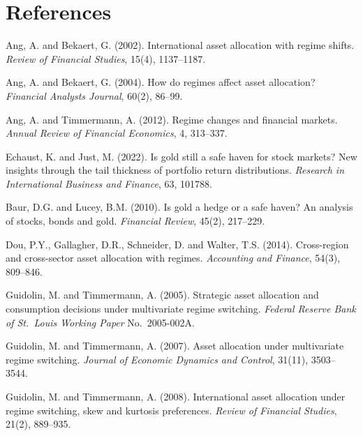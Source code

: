 \documentclass[12pt, a4paper]{article}
\begin{document}
\section*{References}

\begin{description}[leftmargin=2em, itemsep=2pt]

\item Ang, A. and Bekaert, G. (2002). International asset allocation with regime shifts.
  \textit{Review of Financial Studies}, 15(4), 1137--1187.

\item Ang, A. and Bekaert, G. (2004). How do regimes affect asset allocation?
  \textit{Financial Analysts Journal}, 60(2), 86--99.

\item Ang, A. and Timmermann, A. (2012). Regime changes and financial markets.
  \textit{Annual Review of Financial Economics}, 4, 313--337.

\item Echaust, K. and Just, M. (2022). Is gold still a safe haven for stock markets? New insights through the tail thickness of portfolio return distributions. \textit{Research in International Business and Finance}, 63, 101788.

\item Baur, D.G. and Lucey, B.M. (2010). Is gold a hedge or a safe haven? An analysis of
  stocks, bonds and gold. \textit{Financial Review}, 45(2), 217--229.

\item Dou, P.Y., Gallagher, D.R., Schneider, D. and Walter, T.S. (2014). Cross-region and
  cross-sector asset allocation with regimes. \textit{Accounting and Finance}, 54(3),
  809--846.

\item Guidolin, M. and Timmermann, A. (2005). Strategic asset allocation and consumption
  decisions under multivariate regime switching. \textit{Federal Reserve Bank of St.\ Louis
  Working Paper} No.\ 2005-002A.

\item Guidolin, M. and Timmermann, A. (2007). Asset allocation under multivariate regime
  switching. \textit{Journal of Economic Dynamics and Control}, 31(11), 3503--3544.

\item Guidolin, M. and Timmermann, A. (2008). International asset allocation under regime
  switching, skew and kurtosis preferences. \textit{Review of Financial Studies}, 21(2),
  889--935.


\end{description}
\end{document}
